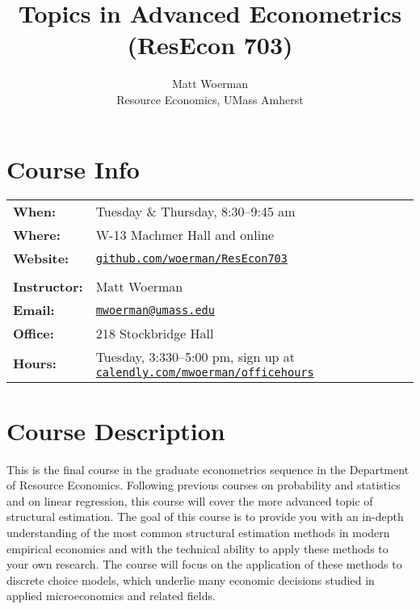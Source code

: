 \documentclass[11pt,letterpaper]{article}
\newcommand{\subtitle}[1]{%
	\posttitle{%
		\par\end{center}
	\begin{center}\large#1\end{center}
	\vskip0.5em}%
}
\begin{document}
\title{Topics in Advanced Econometrics (ResEcon 703)}
\subtitle{Fall 2022 Syllabus\vspace{-2ex}}
\author{Matt Woerman\\Resource Economics, UMass Amherst}
\date{\vspace{-5ex}}

\maketitle

\section*{Course Info}

\begin{tabular}{ll} 
	\textbf{When:} & Tuesday \& Thursday, 8:30--9:45 am \\
	\textbf{Where:} & W-13 Machmer Hall and online \\
	\textbf{Website:} & \href{https://github.com/woerman/ResEcon703}{\texttt{github.com/woerman/ResEcon703}} \\
	\\
	\textbf{Instructor:} & Matt Woerman \\
	\textbf{Email:} & \href{mailto:mwoerman@umass.edu}{\texttt{mwoerman@umass.edu}} \\
	\textbf{Office:} & 218 Stockbridge Hall \\
	\textbf{Hours:} & Tuesday, 3:330--5:00 pm, sign up at \href{https://calendly.com/mwoerman/officehours}{\texttt{calendly.com/mwoerman/officehours}} \\
\end{tabular} 

\section*{Course Description}

This is the final course in the graduate econometrics sequence in the Department of Resource Economics. Following previous courses on probability and statistics and on linear regression, this course will cover the more advanced topic of structural estimation. The goal of this course is to provide you with an in-depth understanding of the most common structural estimation methods in modern empirical economics and with the technical ability to apply these methods to your own research. The course will focus on the application of these methods to discrete choice models, which underlie many economic decisions studied in applied microeconomics and related fields.
\end{document}
